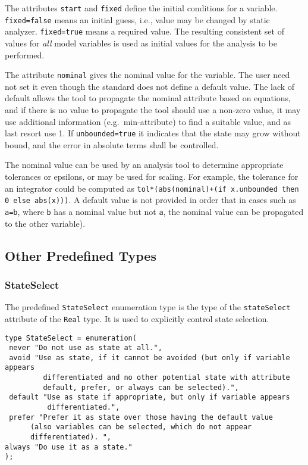 The attributes \lstinline!start! and \lstinline!fixed! define the initial conditions for a
variable. \lstinline!fixed=false! means an initial guess, i.e., value may be
changed by static analyzer. \lstinline!fixed=true! means a required value. The
resulting consistent set of values for \emph{all} model variables is used as
initial values for the analysis to be performed.

The attribute \lstinline!nominal! gives the nominal value for the variable. The user
need not set it even though the standard does not define a default
value. The lack of default allows the tool to propagate the nominal
attribute based on equations, and if there is no value to propagate the
tool should use a non-zero value, it may use additional information
(e.g.\ min-attribute) to find a suitable value, and as last resort use 1.
If \lstinline!unbounded=true! it indicates that the state may grow without
bound, and the error in absolute terms shall be controlled.

\begin{nonnormative}
The nominal value can be used by an analysis tool to determine appropriate tolerances or epsilons, or may be used for scaling. For example,
the tolerance for an integrator could be computed as \lstinline!tol*(abs(nominal)+(if x.unbounded then 0 else abs(x)))!.  A default value
is not provided in order that in cases such as \lstinline!a=b!, where \lstinline!b! has a nominal value but not \lstinline!a!, the nominal
value can be propagated to the other variable).
\end{nonnormative}


\subsection{Other Predefined Types}\label{other-predefined-types}

\subsubsection{StateSelect}\label{stateselect}

The predefined \lstinline!StateSelect! enumeration type is the type of the
\lstinline!stateSelect! attribute of the \lstinline!Real! type. It is used to explicitly control
state selection.

\begin{lstlisting}[language=modelica]
type StateSelect = enumeration(
 never "Do not use as state at all.",
 avoid "Use as state, if it cannot be avoided (but only if variable appears
         differentiated and no other potential state with attribute
         default, prefer, or always can be selected).",
 default "Use as state if appropriate, but only if variable appears
          differentiated.",
 prefer "Prefer it as state over those having the default value
      (also variables can be selected, which do not appear
      differentiated). ",
always "Do use it as a state."
);
\end{lstlisting}

